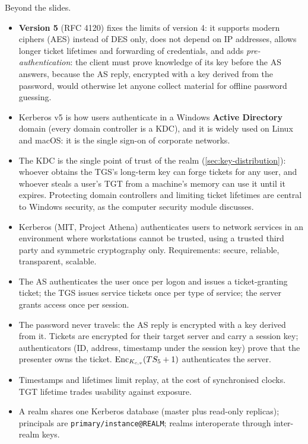 Beyond the slides.
\begin{itemize}
    \item \textbf{Version 5} (RFC 4120) fixes the limits of version 4: it supports modern ciphers (AES) instead of DES only, does not depend on IP addresses, allows longer ticket lifetimes and forwarding of credentials, and adds \emph{pre-authentication}: the client must prove knowledge of its key before the AS answers, because the AS reply, encrypted with a key derived from the password, would otherwise let anyone collect material for offline password guessing.
    \item Kerberos v5 is how users authenticate in a Windows \textbf{Active Directory} domain (every domain controller is a KDC), and it is widely used on Linux and macOS: it is the single sign-on of corporate networks.
    \item The KDC is the single point of trust of the realm (\cref{sec:key-distribution}): whoever obtains the TGS's long-term key can forge tickets for any user, and whoever steals a user's TGT from a machine's memory can use it until it expires. Protecting domain controllers and limiting ticket lifetimes are central to Windows security, as the computer security module discusses.
\end{itemize}

\begin{summary}
\begin{itemize}
    \item Kerberos (MIT, Project Athena) authenticates users to network services in an environment where workstations cannot be trusted, using a trusted third party and symmetric cryptography only. Requirements: secure, reliable, transparent, scalable.
    \item The AS authenticates the user once per logon and issues a ticket-granting ticket; the TGS issues service tickets once per type of service; the server grants access once per session.
    \item The password never travels: the AS reply is encrypted with a key derived from it. Tickets are encrypted for their target server and carry a session key; authenticators (ID, address, timestamp under the session key) prove that the presenter owns the ticket. $\operatorname{Enc}_{K_{c,v}}(TS_5+1)$ authenticates the server.
    \item Timestamps and lifetimes limit replay, at the cost of synchronised clocks. TGT lifetime trades usability against exposure.
    \item A realm shares one Kerberos database (master plus read-only replicas); principals are \texttt{primary/instance@REALM}; realms interoperate through inter-realm keys.
\end{itemize}
\end{summary}

